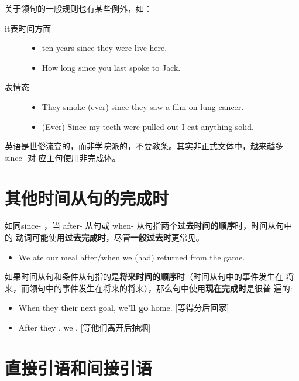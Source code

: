 关于领句的一般规则也有某些例外，如：
\begin{description}
\item[it表时间方面]
  \begin{itemize}
  \item {} ten years since they were live here.

  \item How long  since you last spoke to Jack.
  \end{itemize}

\item[表情态]
  \begin{itemize}
  \item They  smoke (ever) since they saw a film on lung cancer.

  \item (Ever) Since my teeth were pulled out I  eat anything solid.
  \end{itemize}
\end{description}

英语是世俗流变的，而非学院派的，不要教条。其实非正式文体中，越来越多since- 对
应主句使用非完成体。

\section{其他时间从句的完成时}

如同since- ，当 after- 从句或 when- 从句指两个\textbf{过去时间的顺序}时，时间从句中的
动词可能使用\textbf{过去完成时}，尽管\textbf{一般过去时}更常见。
\begin{itemize}
\item We ate our meal after/when we (had) returned from the game.
\end{itemize}


如果时间从句和条件从句指的是\textbf{将来时间的顺序}时（时间从句中的事件发生在
将来，而领句中的事件发生在将来的将来），那么句中使用\textbf{现在完成时}是很普
遍的:
\begin{itemize}
\item When they their next goal, we\textbf{'ll go} home.
  [等得分后回家]

\item After they , we . [等他们离开后抽烟]
\end{itemize}


\section{直接引语和间接引语}

